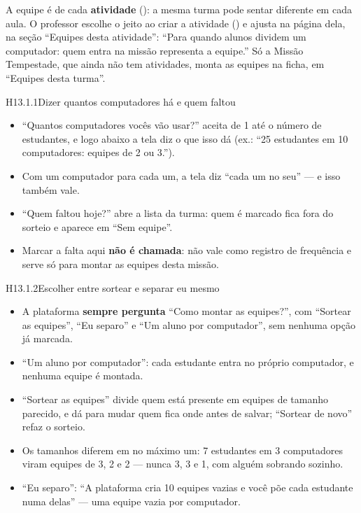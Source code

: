 
A equipe é de cada \textbf{atividade} (): a mesma turma pode sentar
diferente em cada aula. O professor escolhe o jeito ao criar a atividade
() e ajusta na página dela, na seção \enquote{Equipes desta
atividade}: \enquote{Para quando alunos dividem um computador: quem entra na
missão representa a equipe.} Só a Missão Tempestade, que ainda não tem
atividades, monta as equipes na ficha, em \enquote{Equipes desta turma}.

\begin{historia}{H13.1.1}{Dizer quantos computadores há e quem faltou}{\pronto}
\aceite
\begin{itemize}
  \item \enquote{Quantos computadores vocês vão usar?} aceita de 1 até o
    número de estudantes, e logo abaixo a tela diz o que isso dá (ex.:
    \enquote{25 estudantes em 10 computadores: equipes de 2 ou 3.}).
  \item Com um computador para cada um, a tela diz \enquote{cada um no seu}
    --- e isso também vale.
  \item \enquote{Quem faltou hoje?} abre a lista da turma: quem é marcado fica
    fora do sorteio e aparece em \enquote{Sem equipe}.
  \item Marcar a falta aqui \textbf{não é chamada}: não vale como registro de
    frequência e serve só para montar as equipes desta missão.
\end{itemize}
\end{historia}

\begin{historia}{H13.1.2}{Escolher entre sortear e separar eu mesmo}{\pronto}
\aceite
\begin{itemize}
  \item A plataforma \textbf{sempre pergunta} \enquote{Como montar as
    equipes?}, com \enquote{Sortear as equipes}, \enquote{Eu separo} e
    \enquote{Um aluno por computador}, sem nenhuma opção já marcada.
  \item \enquote{Um aluno por computador}: cada estudante entra no próprio
    computador, e nenhuma equipe é montada.
  \item \enquote{Sortear as equipes} divide quem está presente em equipes de
    tamanho parecido, e dá para mudar quem fica onde antes de salvar;
    \enquote{Sortear de novo} refaz o sorteio.
  \item Os tamanhos diferem em no máximo um: 7 estudantes em 3 computadores
    viram equipes de 3, 2 e 2 --- nunca 3, 3 e 1, com alguém sobrando
    sozinho.
  \item \enquote{Eu separo}: \enquote{A plataforma cria 10 equipes vazias e
    você põe cada estudante numa delas} --- uma equipe vazia por computador.
\end{itemize}
\end{historia}

